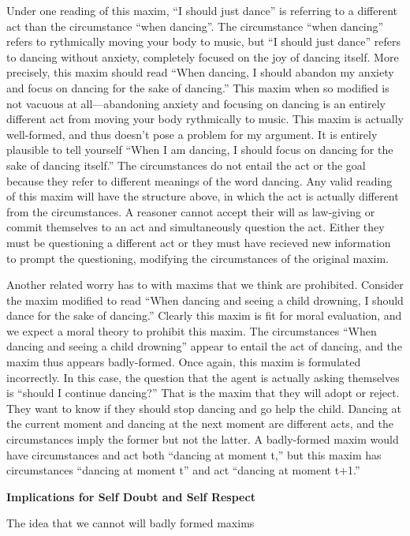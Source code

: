 \begin{isabellebody}
\begin{isamarkuptext}
Under one reading of this maxim, ``I should just dance'' is referring to a different act than the 
circumstance ``when dancing''. The circumstance ``when dancing'' refers 
to rythmically moving your body to music, but ``I should just dance'' refers to dancing without anxiety, 
completely focused on the joy of dancing itself. More precisely, this maxim should read ``When 
dancing, I should abandon my anxiety and focus on dancing for the sake of dancing.'' This maxim when so 
modified is not vacuous at all—abandoning anxiety and focusing on dancing is an entirely different act 
from moving your body rythmically to music. This maxim is actually well-formed, and thus doesn't
pose a problem for my argument. It is entirely plausible to tell yourself ``When I am dancing, I should focus 
on dancing for the sake of dancing itself.'' The circumstances do not entail the act or the goal because 
they refer to different meanings of the word dancing. Any valid reading of this maxim will have the structure above, 
in which the act is actually different from the circumstances. A reasoner cannot accept their will 
as law-giving or commit themselves to an act and simultaneously question the act. Either they must be 
questioning a different act or they must have recieved new information to prompt the questioning, 
modifying the circumstances of the original maxim. 

Another related worry has to with maxims that we think are prohibited. Consider the maxim modified to 
read ``When dancing and seeing a child drowning, I should dance for the sake of dancing.'' Clearly this 
maxim is fit for moral evaluation, and we expect a moral theory to prohibit this maxim. The circumstances 
``When dancing and seeing a child drowning'' appear to entail the act of dancing, and the maxim thus 
appears badly-formed. Once again, this maxim is formulated incorrectly. In this case, the question 
that the agent is actually asking themselves is ``should I continue dancing?'' That is the 
maxim that they will adopt or reject. They want to know if they should stop dancing and go help the child. 
Dancing at the current moment and dancing at the next moment are different acts, and the circumstances 
imply the former but not the latter. A badly-formed maxim would have circumstances and act both 
``dancing at moment t,'' but this maxim has circumstances ``dancing at moment t'' and act ``dancing 
at moment t+1.''

\noindent \textbf{Implications for Self Doubt and Self Respect}

The idea that we cannot will badly formed maxims 


\end{isamarkuptext}
\end{isabellebody}

